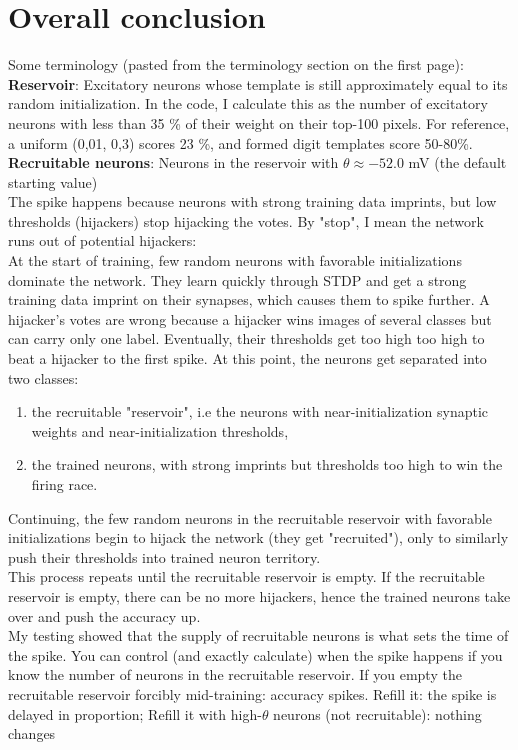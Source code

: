 \documentclass{article}
\begin{document}
\section{Overall conclusion}
Some terminology (pasted from the terminology section on the first page): \\
\textbf{Reservoir}: Excitatory neurons whose template is still approximately equal to its random initialization. In the code, I calculate this as the number of excitatory neurons with less than 35 \% of their weight on their top-100 pixels. For reference, a uniform (0,01, 0,3) scores 23 \%, and formed digit templates score 50-80\%. \\
\textbf{Recruitable neurons}: Neurons in the reservoir with $\theta \approx -52.0$ mV (the default starting value) \\


The spike happens because neurons with strong training data imprints, but low thresholds (hijackers) stop hijacking the votes. By "stop", I
mean the network runs out of potential hijackers: \\
At the start of training, few random neurons with favorable initializations dominate the network. They learn quickly through STDP
and get a strong training data imprint on their synapses, which causes them to spike further. A hijacker's votes are wrong
because a hijacker wins images of several classes but can carry only one label. Eventually, their thresholds get too high
too high to beat a hijacker to the first spike. At this point, the neurons get separated into two classes:
\begin{enumerate}
    \item the recruitable "reservoir", i.e the neurons with near-initialization synaptic weights and near-initialization thresholds,
    \item the trained neurons, with strong imprints but thresholds too high to win the firing race.
\end{enumerate}
Continuing, the few random neurons in the recruitable reservoir with favorable initializations begin to hijack the network (they get "recruited"), only to
similarly push their thresholds into trained neuron territory. \\
This process repeats until the recruitable reservoir is empty. If the recruitable reservoir is empty, there can be no more hijackers, hence the
trained neurons take over and push the accuracy up. \\
My testing showed that the supply of recruitable neurons is what sets the time of the spike. You can control (and exactly calculate) when the spike happens if you know the number of neurons in the recruitable reservoir.
If you empty the recruitable reservoir forcibly mid-training: accuracy spikes. Refill it: the spike is delayed in proportion; Refill it with high-$\theta$ neurons (not recruitable): nothing changes
\end{document}
